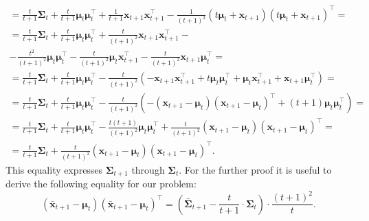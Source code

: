 \documentclass[12pt]{article}
\begin{document}
{\begin{enumerate}
\begin{gather*}
		= \frac{t}{t+1}\mathbf{\Sigma}_t + \frac{t}{t+1}\boldsymbol{\mu}_{t} \boldsymbol{\mu}_{t}^\intercal + \frac{1}{t+1} \mathbf{x}_{t+1} \mathbf{x}_{t+1}^\intercal - \frac{1}{(t+1)^2} (t \boldsymbol{\mu}_t + \mathbf{x}_{t+1})(t \boldsymbol{\mu}_t + \mathbf{x}_{t+1})^\intercal =\\
		= \frac{t}{t+1}\mathbf{\Sigma}_t + \frac{t}{t+1}\boldsymbol{\mu}_{t} \boldsymbol{\mu}_{t}^\intercal + \frac{t}{(t+1)^2} \mathbf{x}_{t+1} \mathbf{x}_{t+1}^\intercal -\\- \frac{t^2}{(t+1)^2}\boldsymbol{\mu}_{t} \boldsymbol{\mu}_{t}^\intercal - \frac{t}{(t+1)^2}\boldsymbol{\mu}_{t} \mathbf{x}_{t+1}^\intercal - \frac{t}{(t+1)^2}\mathbf{x}_{t+1} \boldsymbol{\mu}_{t}^\intercal =\\
		= \frac{t}{t+1}\mathbf{\Sigma}_t + \frac{t}{t+1}\boldsymbol{\mu}_{t} \boldsymbol{\mu}_{t}^\intercal - \frac{t}{(t+1)^2} \left( -\mathbf{x}_{t+1} \mathbf{x}_{t+1}^\intercal + t\boldsymbol{\mu}_{t} \boldsymbol{\mu}_{t}^\intercal + \boldsymbol{\mu}_{t} \mathbf{x}_{t+1}^\intercal + \mathbf{x}_{t+1} \boldsymbol{\mu}_{t}^\intercal \right) =\\
		= \frac{t}{t+1}\mathbf{\Sigma}_t + \frac{t}{t+1}\boldsymbol{\mu}_{t} \boldsymbol{\mu}_{t}^\intercal - \frac{t}{(t+1)^2} \left( -(\mathbf{x}_{t+1}-\boldsymbol{\mu}_t)(\mathbf{x}_{t+1}-\boldsymbol{\mu}_t)^\intercal + (t+1)\boldsymbol{\mu}_{t} \boldsymbol{\mu}_{t}^\intercal \right) =\\
		= \frac{t}{t+1}\mathbf{\Sigma}_t + \frac{t}{t+1}\boldsymbol{\mu}_{t} \boldsymbol{\mu}_{t}^\intercal - \frac{t(t+1)}{(t+1)^2}\boldsymbol{\mu}_{t} \boldsymbol{\mu}_{t}^\intercal + \frac{t}{(t+1)^2}(\mathbf{x}_{t+1}-\boldsymbol{\mu}_t)(\mathbf{x}_{t+1}-\boldsymbol{\mu}_t)^\intercal =\\
		= \frac{t}{t+1}\mathbf{\Sigma}_t + \frac{t}{(t+1)^2}(\mathbf{x}_{t+1}-\boldsymbol{\mu}_t)(\mathbf{x}_{t+1}-\boldsymbol{\mu}_t)^\intercal.
	\end{gather*}
	This equality expresses $\mathbf{\Sigma}_{t+1}$ through $\mathbf{\Sigma}_t$. For the further proof it is useful to derive the following equality for our problem: \[(\bar{\mathbf{x}}_{t+1}-\boldsymbol{\mu}_t)(\bar{\mathbf{x}}_{t+1}-\boldsymbol{\mu}_t)^\intercal = \left(\bar{\mathbf{\Sigma}}_{t+1} - \frac{t}{t+1} \cdot \mathbf{\Sigma}_t \right) \cdot \frac{(t+1)^2}{t}.\]
	

\end{enumerate}}
\end{document}
